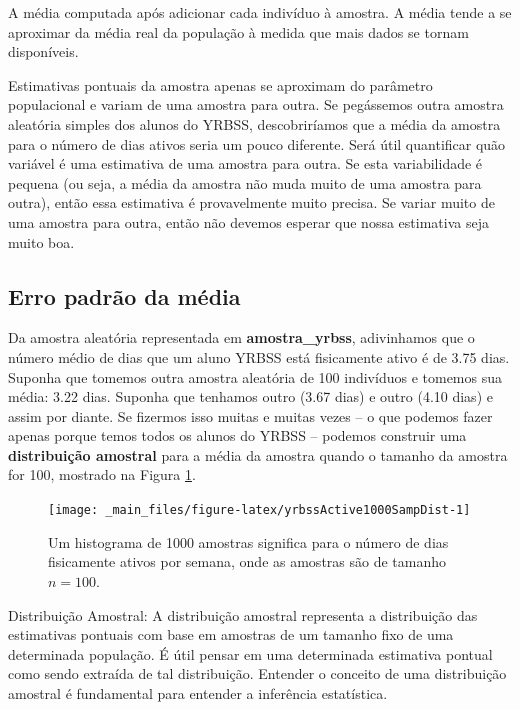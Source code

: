 \documentclass[
]{book}
\theoremstyle{definition}
\theoremstyle{definition}
\theoremstyle{definition}
\theoremstyle{definition}
\theoremstyle{remark}
\begin{document}
\label{fig:yrbssActiveRunningMean}A média computada após adicionar cada indivíduo à amostra. A média tende a se aproximar da média real da população à medida que mais dados se tornam disponíveis.

Estimativas pontuais da amostra apenas se aproximam do parâmetro populacional e variam de uma amostra para outra. Se pegássemos outra amostra aleatória simples dos alunos do YRBSS, descobriríamos que a média da amostra para o número de dias ativos seria um pouco diferente. Será útil quantificar quão variável é uma estimativa de uma amostra para outra. Se esta variabilidade é pequena (ou seja, a média da amostra não muda muito de uma amostra para outra), então essa estimativa é provavelmente muito precisa. Se variar muito de uma amostra para outra, então não devemos esperar que nossa estimativa seja muito boa.

\hypertarget{standardErrorMean}{%
\subsection{Erro padrão da média}\label{standardErrorMean}}

Da amostra aleatória representada em \textbf{amostra\_yrbss}, adivinhamos que o número médio de dias que um aluno YRBSS está fisicamente ativo é de 3.75 dias. Suponha que tomemos outra amostra aleatória de 100 indivíduos e tomemos sua média: 3.22 dias. Suponha que tenhamos outro (3.67 dias) e outro (4.10 dias) e assim por diante. Se fizermos isso muitas e muitas vezes -- o que podemos fazer apenas porque temos todos os alunos do YRBSS -- podemos construir uma \textbf{distribuição amostral} para a média da amostra quando o tamanho da amostra for 100, mostrado na Figura \ref{fig:yrbssActive1000SampDist}.

\begin{figure}

{\centering \texttt{[image: \_main\_files/figure-latex/yrbssActive1000SampDist-1]} 

}

\caption{Um histograma de 1000 amostras significa para o número de dias fisicamente ativos por semana, onde as amostras são de tamanho $n=100$.}\label{fig:yrbssActive1000SampDist}
\end{figure}

Distribuição Amostral: A distribuição amostral representa a distribuição das estimativas pontuais com base em amostras de um tamanho fixo de uma determinada população. É útil pensar em uma determinada estimativa pontual como sendo extraída de tal distribuição. Entender o conceito de uma distribuição amostral é fundamental para entender a inferência estatística.
\end{document}
